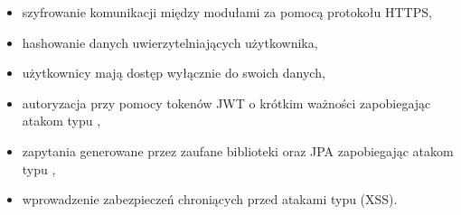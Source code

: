 \begin{itemize}
    \item szyfrowanie komunikacji między modułami za pomocą protokołu HTTPS,
    \item hashowanie danych uwierzytelniających użytkownika,
    \item użytkownicy mają dostęp wyłącznie do swoich danych,
    \item autoryzacja przy pomocy tokenów JWT o krótkim ważności zapobiegając atakom typu ,
    \item zapytania generowane przez zaufane biblioteki oraz JPA zapobiegając atakom typu ,
    \item wprowadzenie zabezpieczeń chroniących przed atakami typu  (XSS).
\end{itemize}